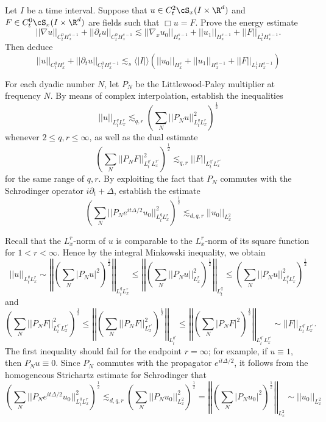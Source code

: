 \begin{statement}
	Let $I$ be a time interval. Suppose that $u \in C^2_t \cS_x (I \times \R^d)$ and $F \in C^0_t \cS_x (I \times \R^d)$ are fields such that $\Box u = F$. Prove the energy estimate
		\[ ||\nabla u ||_{C_t^0 H^{s - 1}_x } + ||\partial_t u ||_{C_t^0 H^{s - 1}_x} \lesssim ||\nabla_x u_0||_{H^{s - 1}_x} + ||u_1||_{H^{s - 1}_x} + ||F||_{L^1_t H^{s - 1}_x}. \]
	Then deduce
		\[ ||u||_{C^0_t H^s_x} + ||\partial_t u||_{C^0_t H^{s - 1}_x} \lesssim_s \langle |I| \rangle \left( ||u_0||_{H^s_x} + ||u_1||_{H^{s - 1}_x} + ||F||_{L^1_t H^{s - 1}_x} \right) \]	
\end{statement}


\begin{solution}

\end{solution}

\begin{statement}
	For each dyadic number $N$, let $P_N$ be the Littlewood-Paley multiplier at frequency $N$. By means of complex interpolation, establish the inequalities
		\[ ||u||_{L^q_t L^r_x} \lesssim _{q, r} \left( \sum_N ||P_N u||^2_{L^q_t L^r_x} \right)^\frac12 \]
	whenever $2 \leq q, r \leq \infty$, as well as the dual estimate
		\[ \left( \sum_N ||P_N F||^2_{L^{q'}_t L^{r'}_x } \right)^\frac12 \lesssim_{q, r} ||F||_{L^{q'}_t L^{r'}_x} \]
	for the same range of $q, r$. By exploiting the fact that $P_N$ commutes with the Schrodinger operator $i \partial_t + \Delta$, establish the estimate
		\[ \left( \sum_N ||P_N e^{it \Delta/2} u_0||_{L^q_t L^r_x}^2 \right)^\frac12 \lesssim_{d, q, r} ||u_0||_{L^2_x} \]		
\end{statement}


\begin{solution}
	Recall that the $L^r_x$-norm of $u$ is comparable to the $L^r_x$-norm of its square function for $1 < r < \infty$. Hence by the integral Minkowski inequality, we obtain
		\[ ||u||_{L^q_t L^r_x} \sim \left|\left| \left( \sum_N |P_N u|^2 \right)^{\frac12} \right|\right|_{L^q_t L^r_x} \leq \left|\left| \left( \sum_N ||P_N u||_{L^r_x}^2 \right)^{\frac12} \right|\right|_{L^q_t} \leq \left( \sum_N ||P_N u||_{L^q_t L^r_x}^2 \right)^{\frac12} \]
	and
		\[ \left( \sum_N ||P_N F||_{L^{q'}_t L^{r'}_x}^2 \right)^{\frac12} \leq \left| \left| \left(\sum_{N} ||P_N F||_{L^{r'}_x}^2 \right)^\frac12 \right| \right|_{L^{q'}_t} \leq \left| \left| \left( \sum_N |P_N F|^2 \right)^\frac12 \right|\right|_{L^{q'}_t L^{r'}_x}  \sim ||F||_{L^{q'}_t L^{r'}_x}. \]	
	The first inequality should fail for the endpoint $r = \infty$; for example, if $u \equiv 1$, then $P_N u \equiv 0$. Since $P_N$ commutes with the propagator $e^{it \Delta/2}$, it follows from the homogeneous Strichartz estimate for Schrodinger that
		\[ \left( \sum_N ||P_N e^{it \Delta/2} u_0||_{L^q_t L^r_x}^2 \right)^\frac12 \lesssim_{d, q, r} \left( \sum_N ||P_N u_0||^2_{L^2_x} \right)^\frac12 =  \left|\left| \left( \sum_N |P_N u_0|^2 \right)^\frac12 \right|\right|_{L^2_x} \sim  ||u_0||_{L^2_x} \]
\end{solution}

